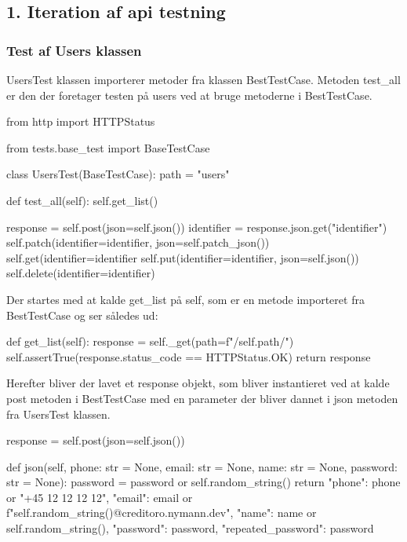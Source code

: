 \subsection{1. Iteration af api testning}
\subsubsection{Test af Users klassen}
UsersTest klassen importerer metoder fra klassen BestTestCase. Metoden test\_all er den der foretager testen på users ved at bruge metoderne i BestTestCase.\\

\begin{code}[language=python, caption=UsersTest.py, firstnumber=1]
from http import HTTPStatus

from tests.base_test import BaseTestCase

class UsersTest(BaseTestCase):
    path = "users"

    def test_all(self):
        self.get_list()

        response = self.post(json=self.json())
        identifier = response.json.get("identifier")
        self.patch(identifier=identifier, json=self.patch_json())
        self.get(identifier=identifier
        self.put(identifier=identifier, json=self.json())
        self.delete(identifier=identifier)
\end{code}

Der startes med at kalde get\_list på self, som er en metode importeret fra BestTestCase og ser således ud:\\

\begin{code}[language=python, caption=BestTestCase.py, firstnumber=55]
def get_list(self):
    response = self._get(path=f"/{self.path}/")
    self.assertTrue(response.status_code == HTTPStatus.OK)
    return response
\end{code}

Herefter bliver der lavet et response objekt, som bliver instantieret ved at kalde post metoden i BestTestCase med en parameter der bliver dannet i json metoden fra UsersTest klassen. \\

\begin{code}[language=python, caption=UsersTest.py, firstnumber=12]
response = self.post(json=self.json())
\end{code}

\begin{code}[language=python, caption=UsersTest.py, firstnumber=19]
def json(self, phone: str = None, email: str = None, name: str = None, password: str = None):
    password = password or self.random_string()
    return {
        "phone": phone or "+45 12 12 12 12",
        "email": email or f"{self.random_string()}@creditoro.nymann.dev",
        "name": name or self.random_string(),
        "password": password,
        "repeated_password": password
    }
\end{code}

